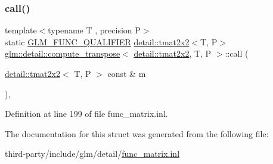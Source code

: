 \subsubsection{\texorpdfstring{call()}{call()}}
{\footnotesize\ttfamily template$<$typename T , precision P$>$ \\
static \hyperlink{setup_8hpp_a33fdea6f91c5f834105f7415e2a64407}{G\+L\+M\+\_\+\+F\+U\+N\+C\+\_\+\+Q\+U\+A\+L\+I\+F\+I\+ER} \hyperlink{structglm_1_1detail_1_1tmat2x2}{detail\+::tmat2x2}$<$T, P$>$ \hyperlink{structglm_1_1detail_1_1compute__transpose}{glm\+::detail\+::compute\+\_\+transpose}$<$ \hyperlink{structglm_1_1detail_1_1tmat2x2}{detail\+::tmat2x2}, T, P $>$\+::call (\begin{DoxyParamCaption}\item[{\hyperlink{structglm_1_1detail_1_1tmat2x2}{detail\+::tmat2x2}$<$ T, P $>$ const \&}]{m }\end{DoxyParamCaption})\hspace{0.3cm}{\ttfamily [inline]}, {\ttfamily [static]}}



Definition at line 199 of file func\+\_\+matrix.\+inl.



The documentation for this struct was generated from the following file\+:\begin{DoxyCompactItemize}
\item 
third-\/party/include/glm/detail/\hyperlink{func__matrix_8inl}{func\+\_\+matrix.\+inl}\end{DoxyCompactItemize}
